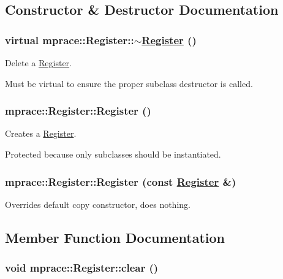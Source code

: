 \subsection{Constructor \& Destructor Documentation}
\hypertarget{classmprace_1_1Register_a0}{
\subsubsection[$\sim$Register]{\setlength{\rightskip}{0pt plus 5cm}virtual mprace::Register::$\sim$\hyperlink{classmprace_1_1Register}{Register} ()}}
\label{classmprace_1_1Register_a0}


Delete a \hyperlink{classmprace_1_1Register}{Register}. 

Must be virtual to ensure the proper subclass destructor is called.\hypertarget{classmprace_1_1Register_b0}{
\subsubsection[Register]{\setlength{\rightskip}{0pt plus 5cm}mprace::Register::Register ()}}
\label{classmprace_1_1Register_b0}


Creates a \hyperlink{classmprace_1_1Register}{Register}. 

Protected because only subclasses should be instantiated.\hypertarget{classmprace_1_1Register_b1}{
\subsubsection[Register]{\setlength{\rightskip}{0pt plus 5cm}mprace::Register::Register (const \hyperlink{classmprace_1_1Register}{Register} \&)}}
\label{classmprace_1_1Register_b1}


Overrides default copy constructor, does nothing. 



\subsection{Member Function Documentation}
\hypertarget{classmprace_1_1Register_a4}{
\subsubsection[clear]{\setlength{\rightskip}{0pt plus 5cm}void mprace::Register::clear ()}}
\label{classmprace_1_1Register_a4}


